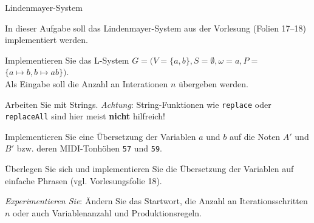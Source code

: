 \documentclass{uebungsblatt}
\begin{document}
\begin{aufgabe}{Lindenmayer-System}
	
	In dieser Aufgabe soll das Lindenmayer-System aus der Vorlesung (Folien 17--18) implementiert werden.
	
	\begin{teilaufgabe}
		Implementieren Sie das L-System $G = (V$$=$$\{a,b\}, S$$=$$\emptyset, \omega$$=$$a, P$$=$$\{a\mapsto b,b\mapsto ab\})$.\\
		Als Eingabe soll die Anzahl an Interationen $n$ übergeben werden.
	\end{teilaufgabe}
	\begin{tipp}
		Arbeiten Sie mit Strings. {\emph{Achtung}}: String-Funktionen wie \texttt{replace} oder \texttt{replaceAll} sind hier meist \textbf{nicht} hilfreich!
	\end{tipp}
	
	\begin{teilaufgabe}
		Implementieren Sie eine Übersetzung der Variablen $a$ und $b$ auf die Noten $A'$ und $B'$ bzw. deren MIDI-Tonhöhen \texttt{57} und \texttt{59}.
	\end{teilaufgabe}

	\begin{teilaufgabe}
		Überlegen Sie sich und implementieren Sie die Übersetzung der Variablen auf einfache Phrasen (vgl. Vorlesungsfolie 18).
	\end{teilaufgabe}

	\begin{teilaufgabe}
		\emph{Experimentieren Sie}: Ändern Sie das Startwort, die Anzahl an Iterationsschritten $n$ oder auch Variablenanzahl und Produktionsregeln.
	\end{teilaufgabe}
	
\end{aufgabe}

\pagebreak
\end{document}
